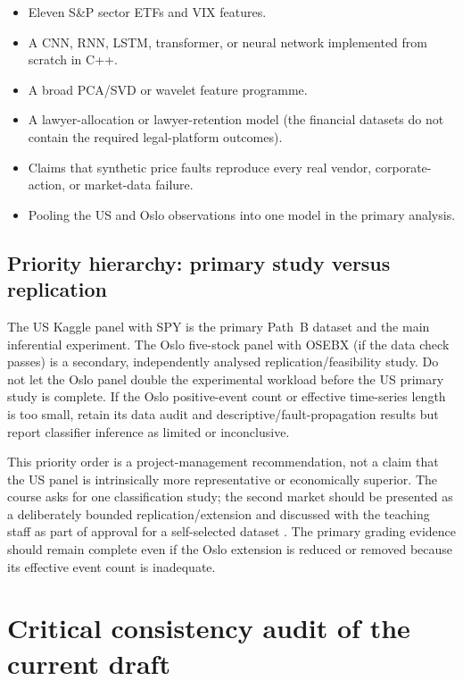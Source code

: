 \documentclass[11pt,a4paper]{article}
\begin{document}
\begin{itemize}
  \item Eleven S\&P sector ETFs and VIX features.
  \item A CNN, RNN, LSTM, transformer, or neural network implemented from scratch in C++.
  \item A broad PCA/SVD or wavelet feature programme.
  \item A lawyer-allocation or lawyer-retention model (the financial datasets do not contain the required legal-platform outcomes).
  \item Claims that synthetic price faults reproduce every real vendor, corporate-action, or market-data failure.
  \item Pooling the US and Oslo observations into one model in the primary analysis.
\end{itemize}

\subsection{Priority hierarchy: primary study versus replication}

\begin{decisionbox}
The US Kaggle panel with SPY is the primary Path~B dataset and the main inferential experiment. The Oslo five-stock panel with OSEBX (if the data check passes) is a secondary, independently analysed replication/feasibility study. Do not let the Oslo panel double the experimental workload before the US primary study is complete. If the Oslo positive-event count or effective time-series length is too small, retain its data audit and descriptive/fault-propagation results but report classifier inference as limited or inconclusive.
\end{decisionbox}

This priority order is a project-management recommendation, not a claim that the US panel is intrinsically more representative or economically superior. The course asks for one classification study; the second market should be presented as a deliberately bounded replication/extension and discussed with the teaching staff as part of approval for a self-selected dataset \cite{UiOProject3}. The primary grading evidence should remain complete even if the Oslo extension is reduced or removed because its effective event count is inadequate.

\section{Critical consistency audit of the current draft}
\label{sec:audit}
\end{document}
